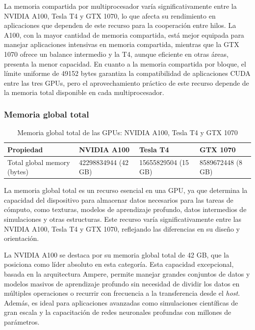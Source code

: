 \documentclass{article}
\begin{document}
			La memoria compartida por multiprocesador varía significativamente entre la NVIDIA A100, Tesla T4 y GTX 1070, lo que afecta su rendimiento en aplicaciones que dependen de este recurso para la cooperación entre hilos. La A100, con la mayor cantidad de memoria compartida, está mejor equipada para manejar aplicaciones intensivas en memoria compartida, mientras que la GTX 1070 ofrece un balance intermedio y la T4, aunque eficiente en otras áreas, presenta la menor capacidad. En cuanto a la memoria compartida por bloque, el límite uniforme de 49152 bytes garantiza la compatibilidad de aplicaciones CUDA entre las tres GPUs, pero el aprovechamiento práctico de este recurso depende de la memoria total disponible en cada multiprocesador.

		\subsubsection{Memoria global total}

			\begin{table}[H]
				\begin{adjustbox}{width=\textwidth, keepaspectratio}
					\begin{tabular}{|l|l|l|l|}
						\hline
						\textbf{Propiedad} & \textbf{NVIDIA A100} & \textbf{Tesla T4} & \textbf{GTX 1070} \\ \hline
						Total global memory (bytes) & 42298834944 (42 GB) & 15655829504 (15 GB) & 8589672448 (8 GB) \\ \hline
					\end{tabular}
				\end{adjustbox}
				\centering
				\caption{Memoria global total de las GPUs: NVIDIA A100, Tesla T4 y GTX 1070}
			\end{table}

			La memoria global total es un recurso esencial en una GPU, ya que determina la capacidad del dispositivo para almacenar datos necesarios para las tareas de cómputo, como texturas, modelos de aprendizaje profundo, datos intermedios de simulaciones y otras estructuras. Este recurso varía significativamente entre las NVIDIA A100, Tesla T4 y GTX 1070, reflejando las diferencias en su diseño y orientación.

			La NVIDIA A100 se destaca por su memoria global total de 42 GB, que la posiciona como líder absoluto en esta categoría. Esta capacidad excepcional, basada en la arquitectura Ampere, permite manejar grandes conjuntos de datos y modelos masivos de aprendizaje profundo sin necesidad de dividir los datos en múltiples operaciones o recurrir con frecuencia a la transferencia desde el \textit{host}. Además, es ideal para aplicaciones avanzadas como simulaciones científicas de gran escala y la capacitación de redes neuronales profundas con millones de parámetros.
\end{document}
